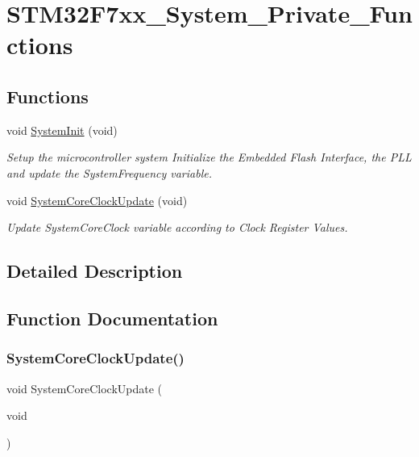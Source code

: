 \hypertarget{group__STM32F7xx__System__Private__Functions}{}\section{S\+T\+M32\+F7xx\+\_\+\+System\+\_\+\+Private\+\_\+\+Functions}
\label{group__STM32F7xx__System__Private__Functions}
\subsection*{Functions}
\begin{DoxyCompactItemize}
\item 
void \mbox{\hyperlink{group__STM32F7xx__System__Private__Functions_ga93f514700ccf00d08dbdcff7f1224eb2}{System\+Init}} (void)
\begin{DoxyCompactList}\small\item\em Setup the microcontroller system Initialize the Embedded Flash Interface, the P\+LL and update the System\+Frequency variable. \end{DoxyCompactList}\item 
void \mbox{\hyperlink{group__STM32F7xx__System__Private__Functions_gae0c36a9591fe6e9c45ecb21a794f0f0f}{System\+Core\+Clock\+Update}} (void)
\begin{DoxyCompactList}\small\item\em Update System\+Core\+Clock variable according to Clock Register Values. \end{DoxyCompactList}\end{DoxyCompactItemize}


\subsection{Detailed Description}


\subsection{Function Documentation}
\mbox{\label{group__STM32F7xx__System__Private__Functions_gae0c36a9591fe6e9c45ecb21a794f0f0f}} 
\subsubsection{\texorpdfstring{SystemCoreClockUpdate()}{SystemCoreClockUpdate()}}
{\footnotesize\ttfamily void System\+Core\+Clock\+Update (\begin{DoxyParamCaption}\item[{void}]{ }\end{DoxyParamCaption})}



